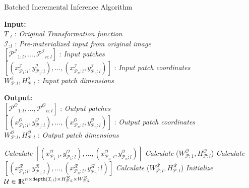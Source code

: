 \begin{algorithm}
    \caption{Batched Incremental Inference Algorithm}
    \label{alg:incinference}
    \begin{flushleft}
     \hspace*{1mm} \textbf{Input:} \\
     \hspace*{3mm} $T_{:l}$ : \textit{Original Transformation function}\\
     \hspace*{3mm} $\mathcal{I}_{:l}$ : \textit{Pre-materialized input from original image}\\
     \hspace*{3mm} $[\mathcal{P^I}_{1:l},...,\mathcal{P^I}_{n:l}]$ : \textit{Input patches}\\
     \hspace*{3mm} $[(x^\mathcal{I}_{\mathcal{P}_1:l},y^\mathcal{I}_{\mathcal{P}_1:l}),...,(x^\mathcal{I}_{\mathcal{P}_n:l},y^\mathcal{I}_{\mathcal{P}_n:l})]$ : \textit{Input patch coordinates}\\
     \hspace*{3mm} $W^\mathcal{I}_{\mathcal{P}:l},H^\mathcal{I}_{\mathcal{P}:l}$ : \textit{Input patch dimensions}
    \end{flushleft}

    \begin{flushleft}
     \hspace*{1mm} \textbf{Output:}\\
     \hspace*{3mm} $[\mathcal{P^O}_{1:l},...,\mathcal{P^O}_{n:l}]$ : \textit{Output patches}\\
     \hspace*{3mm} $[(x^\mathcal{O}_{\mathcal{P}_1:l},y^\mathcal{O}_{\mathcal{P}_1:l}),...,(x^\mathcal{O}_{\mathcal{P}_n:l},y^\mathcal{O}_{\mathcal{P}_n:l})]$ : \textit{Output patch coordinates}\\
     \hspace*{3mm} $W^\mathcal{O}_{\mathcal{P}:l},H^\mathcal{O}_{\mathcal{P}:l}$ : \textit{Output patch dimensions}
    \end{flushleft}

    \begin{algorithmic}[1]
    \State \textit{Calculate} $[(x^\mathcal{O}_{\mathcal{P}_1:l},y^\mathcal{O}_{\mathcal{P}_1:l}),...,(x^\mathcal{O}_{\mathcal{P}_n:l},y^\mathcal{O}_{\mathcal{P}_n:l})]$ 
    \State \textit{Calculate} ($W^\mathcal{O}_{\mathcal{P}:1},H^\mathcal{O}_{\mathcal{P}:l}$)
    \State \textit{Calculate} $[(x^\mathcal{R}_{\mathcal{P}_1:l},y^\mathcal{R}_{\mathcal{P}_1:l}),...,(x^\mathcal{R}_{\mathcal{P}_n:l},y^\mathcal{R}_{\mathcal{P}_n}:l)]$
    \State \textit{Calculate} ($W^\mathcal{R}_{\mathcal{P}:l},H^\mathcal{R}_{\mathcal{P}:l}$)
    \State \textit{Initialize} $\mathcal{U} \in \mathcal{\rm I\!R}^{n \times \texttt{depth}(\mathcal{I}_{:l}) \times H^\mathcal{R}_{\mathcal{P}:l} \times W^\mathcal{R}_{\mathcal{P}:l}}$


\end{algorithmic}
\end{algorithm}
